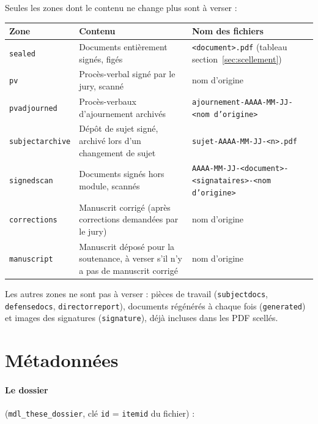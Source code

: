 \documentclass[11pt,a4paper]{article}
\begin{document}
Seules les zones dont le contenu ne change plus sont à verser :

\begin{center}
\small
\begin{tabularx}{\linewidth}{@{}l X X@{}}
\toprule
\textbf{Zone} & \textbf{Contenu} & \textbf{Nom des fichiers} \\
\midrule
\texttt{sealed} & Documents entièrement signés, figés & \texttt{<document>.pdf} (tableau
section~\ref{sec:scellement}) \\
\texttt{pv} & Procès-verbal signé par le jury, scanné & nom d'origine \\
\texttt{pvadjourned} & Procès-verbaux d'ajournement archivés & \texttt{ajournement-AAAA-MM-JJ-<nom d'origine>} \\
\texttt{subjectarchive} & Dépôt de sujet signé, archivé lors d'un changement de sujet &
\texttt{sujet-AAAA-MM-JJ-<n>.pdf} \\
\texttt{signedscan} & Documents signés hors module, scannés &
\texttt{AAAA-MM-JJ-<document>-<signataires>-<nom d'origine>} \\
\texttt{corrections} & Manuscrit corrigé (après corrections demandées par le jury) & nom d'origine \\
\texttt{manuscript} & Manuscrit déposé pour la soutenance, à verser s'il n'y a pas de manuscrit corrigé & nom d'origine \\
\bottomrule
\end{tabularx}
\end{center}

Les autres zones ne sont pas à verser : pièces de travail (\texttt{subjectdocs},
\texttt{defensedocs}, \texttt{directorreport}), documents régénérés à chaque fois
(\texttt{generated}) et images des signatures (\texttt{signature}), déjà incluses dans les PDF scellés.

\section{Métadonnées}\label{sec:metadonnees}

\paragraph{Le dossier} (\texttt{mdl\_these\_dossier}, clé \texttt{id} = \texttt{itemid} du fichier) :
\end{document}
